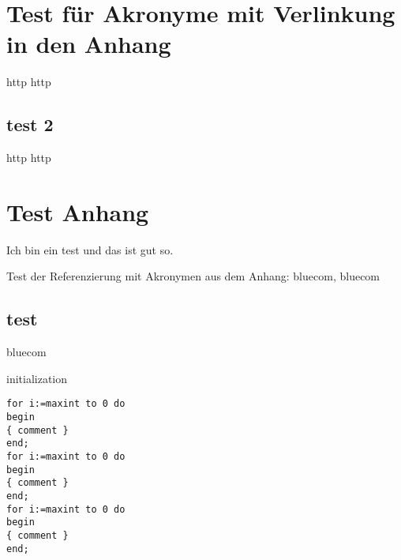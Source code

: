\documentclass[.\jobname.tex]{subfiles}
\begin{document}
\chapter{Test für Akronyme mit Verlinkung in den Anhang}
\gls{http} \acrshort{http}
%
\section{test 2}
%
\gls{http} \acrshort{http}
%
\chapter{Test Anhang}\label{sec: test anhang}
%
Ich bin ein test und das ist gut so.\par
%
Test der Referenzierung mit Akronymen aus dem Anhang: \gls{bluecom}, \acrshort{bluecom}
%
\section{test}
%
\acrshort{bluecom}
%
\begin{algorithm}
	\SetAlgoNoLine
	\DontPrintSemicolon
	initialization\;
	\label{algo: second algo anhang}
\end{algorithm}
%
\begin{lstlisting}[caption={example}]
for i:=maxint to 0 do
begin
{ comment }
end;
for i:=maxint to 0 do
begin
{ comment }
end;
for i:=maxint to 0 do
begin
{ comment }
end;
\end{lstlisting}
%
\blinddocument
%
\end{document}
